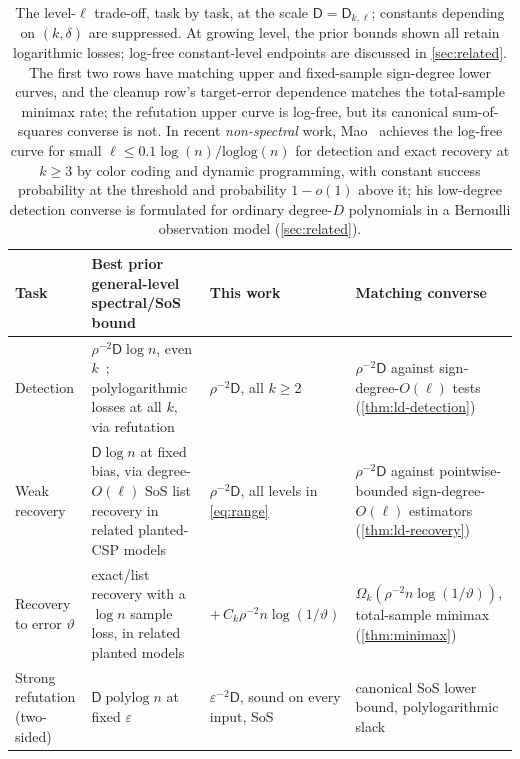 \documentclass[11pt]{article}
\theoremstyle{definition}
\theoremstyle{remark}
\newcommand{\1}{\mathbf 1}
\newcommand{\eps}{\varepsilon}
\newcommand{\Dkl}{\mathsf D_{k,\ell}}
\numberwithin{equation}{section}
\begin{document}
\begin{table}[t]
\centering\small\setlength{\tabcolsep}{5pt}\renewcommand{\arraystretch}{1.2}
\begin{tabular}{@{}>{\raggedright\arraybackslash}p{}
>{\raggedright\arraybackslash}p{}
>{\raggedright\arraybackslash}p{}
>{\raggedright\arraybackslash}p{}@{}}
\toprule
Task & Best prior general-level spectral/SoS bound & This work &
 Matching converse\\
\midrule
Detection &
 $\rho^{-2}\mathsf D\log n$, even $k$~\cite{WEM,SOKB};
 polylogarithmic losses at all $k$, via
 refutation~\cite{RRS,GKM} &
 $\rho^{-2}\mathsf D$, all $k\ge2$ &
 $\rho^{-2}\mathsf D$ against sign-degree-$O(\ell)$ tests
 (\cref{thm:ld-detection})\\
Weak recovery &
 $\mathsf D\log n$ at fixed bias, via degree-$O(\ell)$ SoS list
 recovery in related planted-CSP models~\cite{BHLM} &
 $\rho^{-2}\mathsf D$, all levels in \cref{eq:range} &
 $\rho^{-2}\mathsf D$ against pointwise-bounded sign-degree-$O(\ell)$
 estimators (\cref{thm:ld-recovery})\\
Recovery to error $\vartheta$ &
 exact/list recovery with a $\log n$ sample loss, in related planted
 models~\cite{BHLM} &
 $+\,C_k\rho^{-2}n\log(1/\vartheta)$ &
 $\Omega_k(\rho^{-2}n\log(1/\vartheta))$, total-sample minimax
 (\cref{thm:minimax})\\
Strong refutation (two-sided) &
 $\mathsf D\operatorname{polylog}n$ at fixed
 $\eps$~\cite{RRS,GKM,HKM} &
 $\eps^{-2}\mathsf D$, sound on every input, SoS &
 canonical SoS lower bound, polylogarithmic slack~\cite{KMOW}\\
\bottomrule
\end{tabular}
\caption{The level-$\ell$ trade-off, task by task, at the scale
$\mathsf D=\Dkl$; constants depending on $(k,\delta)$ are suppressed.
At growing level, the prior bounds shown all retain logarithmic losses;
log-free constant-level endpoints are discussed in \cref{sec:related}.
The first two rows have matching upper and fixed-sample sign-degree
lower curves, and the cleanup row's target-error dependence matches the
total-sample minimax rate; the refutation upper curve is log-free, but
its canonical sum-of-squares converse is not.  In recent
\emph{non-spectral} work, Mao~\cite{Mao2026} achieves the log-free
curve for small $\ell \leq 0.1 \log(n)/\mathrm{loglog}(n)$ for detection and exact recovery at $k\ge3$ by color coding and
dynamic programming, with constant success probability at the threshold
and probability $1-o(1)$ above it; his low-degree detection converse is
formulated for ordinary degree-$D$ polynomials in a Bernoulli
observation model (\cref{sec:related}).}
\label{tab:ledger}
\end{table}
\end{document}
